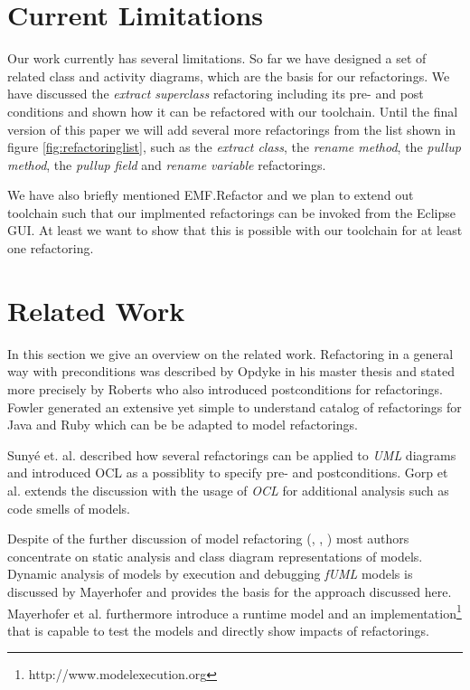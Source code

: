 \documentclass{llncs}
\begin{document}
\section{Current Limitations}
Our work currently has several limitations. So far we have designed a set of related class and activity diagrams,
which are the basis for our refactorings. We have discussed the \textit{extract superclass} refactoring including its
pre- and post conditions and shown how it can be refactored with our toolchain. Until the final version of this
paper we will add several more refactorings from the list shown in figure \ref{fig:refactoringlist}, such as the
\textit{extract class}, the \textit{rename method}, the \textit{pullup method}, the \textit{pullup field} and 
\textit{rename variable} refactorings.

We have also briefly mentioned EMF.Refactor and we plan to extend out toolchain such that our implmented refactorings
can be invoked from the Eclipse GUI. At least we want to show that this is possible with our toolchain for at least one refactoring.

\section{Related Work}
\label{sec:relatedwork}

In this section we give an overview on the related work. Refactoring in a general way with preconditions was described
by Opdyke \cite{mast:REFOOF} in his master thesis and stated more precisely by Roberts \cite{rob99} who also introduced
postconditions for refactorings. Fowler \cite{fow99} generated an extensive yet simple to understand catalog of
refactorings for Java and Ruby which can be be adapted to model refactorings.


Suny{\'e} et. al. \cite{DBLP:conf/uml/SunyePTJ01} described how several refactorings can be applied to \textit{UML}
diagrams and introduced OCL as a possiblity to specify pre- and postconditions. Gorp et al. \cite{gorp03} extends the
discussion with the usage of \textit{OCL} for additional analysis such as code smells of models.


Despite of the further discussion of model refactoring (\cite{DBLP:conf/uml/CorreaW04}, \cite{DBLP:conf/ershov/BaarM06},
\cite{DBLP:journals/ase/ArendtT13}) most authors concentrate on static analysis and class diagram representations of
models. Dynamic analysis of models by execution and debugging \textit{fUML} models is discussed by Mayerhofer
\cite{DBLP:conf/icse/Mayerhofer12} and provides the basis for the approach discussed here. Mayerhofer et al.
\cite{DBLP:conf/models/MayerhoferLK12} furthermore introduce a runtime model and an
implementation\footnote{http://www.modelexecution.org} that is capable to test the models and directly show impacts of
refactorings.
\end{document}
